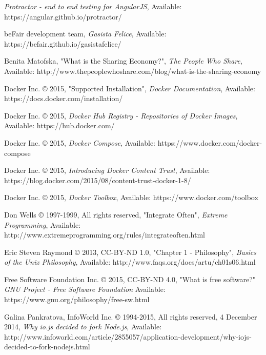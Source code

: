 \begin{thebibliography}{999}

\raggedright
{\em Protractor - end to end testing for AngularJS},
Available: https://angular.github.io/protractor/

\raggedright
beFair development team,
{\em Gasista Felice},
Available: https://befair.github.io/gasistafelice/

\raggedright
Benita Matofska, "What is the Sharing Economy?",
{\em The People Who Share},
Available: http://www.thepeoplewhoshare.com/blog/what-is-the-sharing-economy

Docker Inc. © 2015, "Supported Installation",
{\em Docker Documentation},
Available: https://docs.docker.com/installation/

Docker Inc. © 2015,
{\em Docker Hub Registry - Repositories of Docker Images},
Available: https://hub.docker.com/

\raggedright
Docker Inc. © 2015,
{\em Docker Compose},
Available: https://www.docker.com/docker-compose

\raggedright
Docker Inc. © 2015,
{\em Introducing Docker Content Trust},
Available: https://blog.docker.com/2015/08/content-trust-docker-1-8/

\raggedright
Docker Inc. © 2015,
{\em Docker Toolbox},
Available: https://www.docker.com/toolbox

\raggedright
Don Wells © 1997-1999, All rights reserved, "Integrate Often",
{\em Extreme Programming},
Available: http://www.extremeprogramming.org/rules/integrateoften.html

\raggedright
Eric Steven Raymond © 2013, CC-BY-ND 1.0, "Chapter 1 - Philosophy",
{\em Basics of the Unix Philosophy},
Available: http://www.faqs.org/docs/artu/ch01s06.html

\raggedright
Free Software Foundation Inc. © 2015, CC-BY-ND 4.0, "What is free software?"
{\em GNU Project - Free Software Foundation}
Available: https://www.gnu.org/philosophy/free-sw.html

\raggedright
Galina Pankratova, InfoWorld Inc. © 1994-2015, All rights reserved, 4 December 2014,
{\em Why io.js decided to fork Node.js},
Available: http://www.infoworld.com/article/2855057/application-development/why-iojs-decided-to-fork-nodejs.html


\end{thebibliography}

